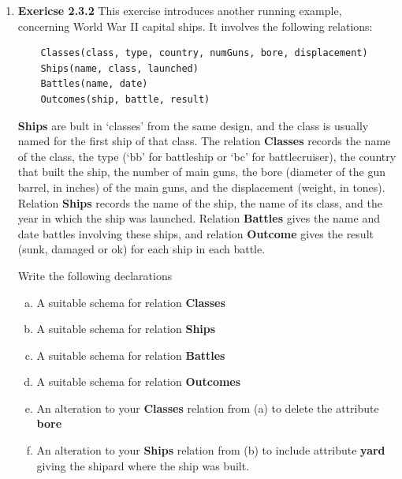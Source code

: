 \documentclass[12pt]{article}
\begin{document}
\begin{enumerate}[1.]
    \item \textbf{Exericse 2.3.2} This exercise introduces another running example,
    concerning World War II capital ships. It involves the following relations:

    \bigskip

    \begin{lstlisting}
    Classes(class, type, country, numGuns, bore, displacement)
    Ships(name, class, launched)
    Battles(name, date)
    Outcomes(ship, battle, result)
    \end{lstlisting}

    \textbf{Ships} are bult in `classes' from the same design, and the class is
    usually named for the first ship of that class. The relation \textbf{Classes}
    records the name of the class, the type (`bb' for battleship or `bc' for battlecruiser),
    the country that built the ship, the number of main guns, the bore (diameter of
    the gun barrel, in inches) of the main guns, and the displacement (weight, in tones).
    Relation \textbf{Ships} records the name of the ship, the name of its class,
    and the year in which the ship was launched. Relation \textbf{Battles} gives
    the name and date battles involving these ships, and relation \textbf{Outcome}
    gives the result (sunk, damaged or ok) for each ship in each battle.

    \bigskip

    Write the following  declarations

    \bigskip

    \begin{enumerate}[a)]
        \item A suitable schema for relation \textbf{Classes}
        \item A suitable schema for relation \textbf{Ships}
        \item A suitable schema for relation \textbf{Battles}
        \item A suitable schema for relation \textbf{Outcomes}
        \item An alteration to your \textbf{Classes} relation from (a) to delete
        the attribute \textbf{bore}
        \item An alteration to your \textbf{Ships} relation from (b) to include
        attribute \textbf{yard} giving the shipard where the ship was built.
    \end{enumerate}
\end{enumerate}
\end{document}
